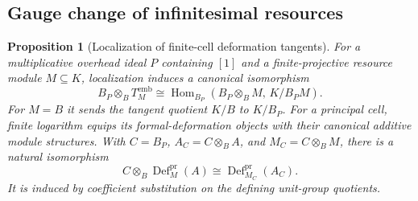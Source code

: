 \documentclass[11pt,a4paper]{article}
\numberwithin{algorithm}{section}
\numberwithin{equation}{section}
\newtheorem{proposition}[proposition]{Proposition}
\theoremstyle{definition}
\theoremstyle{remark}
\theoremstyle{plain}
\newcommand{\Hom}{\operatorname{Hom}}
\theoremstyle{definition}
\theoremstyle{plain}
\begin{document}
\subsection{Gauge change of infinitesimal resources}
\begin{proposition}[Localization of finite-cell deformation tangents]
\label{prop:gauge-deformation}
For a multiplicative overhead ideal $P$ containing $[1]$
and a finite-projective resource module $M\subseteq K$,
localization induces a canonical isomorphism
\begin{equation}\label{eq:gauge-deformation}
 B_P\otimes_B T_M^{\mathrm{emb}}
 \cong\Hom_{B_P}(B_P\otimes_BM,\,K/B_PM).
\end{equation}
For $M=B$ it sends the tangent quotient $K/B$
to $K/B_P$. For a principal cell, finite logarithm equips its
formal-deformation objects with their canonical additive module
structures. With $C=B_P$, $A_C=C\otimes_BA$, and
$M_C=C\otimes_BM$, there is a natural isomorphism
\begin{equation}\label{eq:gauge-formal-deformation}
 C\otimes_B\operatorname{Def}^{\mathrm{pr}}_M(A)
 \cong\operatorname{Def}^{\mathrm{pr}}_{M_C}(A_C).
\end{equation}
It is induced by coefficient substitution on the defining
unit-group quotients.
\end{proposition}
\end{document}
